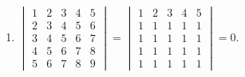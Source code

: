 \begin{enumerate}
			\item %
			      $\begin{vmatrix}
					      1 & 2 & 3 & 4 & 5 \\
					      2 & 3 & 4 & 5 & 6 \\
					      3 & 4 & 5 & 6 & 7 \\
					      4 & 5 & 6 & 7 & 8 \\
					      5 & 6 & 7 & 8 & 9
				      \end{vmatrix} = \begin{vmatrix}
					      1 & 2 & 3 & 4 & 5 \\
					      1 & 1 & 1 & 1 & 1 \\
					      1 & 1 & 1 & 1 & 1 \\
					      1 & 1 & 1 & 1 & 1 \\
					      1 & 1 & 1 & 1 & 1
				      \end{vmatrix} = 0$.


\end{enumerate}

